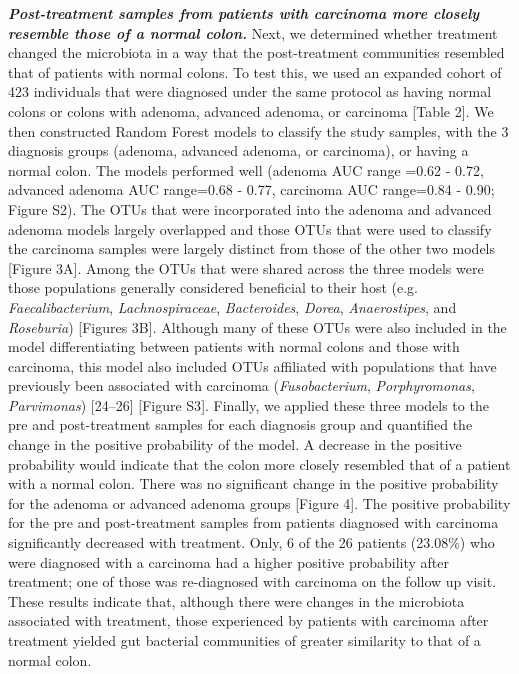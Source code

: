 \documentclass[12pt,]{article}
\begin{document}
\textbf{\emph{Post-treatment samples from patients with carcinoma more
closely resemble those of a normal colon.}} Next, we determined whether
treatment changed the microbiota in a way that the post-treatment
communities resembled that of patients with normal colons. To test this,
we used an expanded cohort of 423 individuals that were diagnosed under
the same protocol as having normal colons or colons with adenoma,
advanced adenoma, or carcinoma {[}Table 2{]}. We then constructed Random
Forest models to classify the study samples, with the 3 diagnosis groups
(adenoma, advanced adenoma, or carcinoma), or having a normal colon. The
models performed well (adenoma AUC range =0.62 - 0.72, advanced adenoma
AUC range=0.68 - 0.77, carcinoma AUC range=0.84 - 0.90; Figure S2). The
OTUs that were incorporated into the adenoma and advanced adenoma models
largely overlapped and those OTUs that were used to classify the
carcinoma samples were largely distinct from those of the other two
models {[}Figure 3A{]}. Among the OTUs that were shared across the three
models were those populations generally considered beneficial to their
host (e.g. \emph{Faecalibacterium}, \emph{Lachnospiraceae},
\emph{Bacteroides}, \emph{Dorea}, \emph{Anaerostipes}, and
\emph{Roseburia}) {[}Figures 3B{]}. Although many of these OTUs were
also included in the model differentiating between patients with normal
colons and those with carcinoma, this model also included OTUs
affiliated with populations that have previously been associated with
carcinoma (\emph{Fusobacterium}, \emph{Porphyromonas},
\emph{Parvimonas}) {[}24--26{]} {[}Figure S3{]}. Finally, we applied
these three models to the pre and post-treatment samples for each
diagnosis group and quantified the change in the positive probability of
the model. A decrease in the positive probability would indicate that
the colon more closely resembled that of a patient with a normal colon.
There was no significant change in the positive probability for the
adenoma or advanced adenoma groups {[}Figure 4{]}. The positive
probability for the pre and post-treatment samples from patients
diagnosed with carcinoma significantly decreased with treatment. Only, 6
of the 26 patients (23.08\%) who were diagnosed with a carcinoma had a
higher positive probability after treatment; one of those was
re-diagnosed with carcinoma on the follow up visit. These results
indicate that, although there were changes in the microbiota associated
with treatment, those experienced by patients with carcinoma after
treatment yielded gut bacterial communities of greater similarity to
that of a normal colon.
\end{document}
